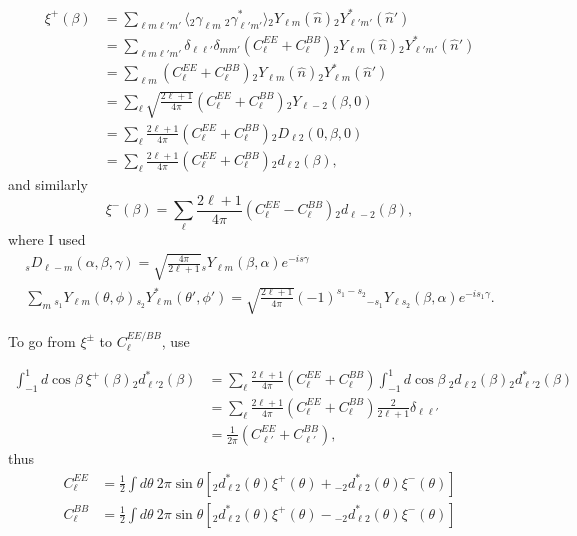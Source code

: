 \begin{align}
    \nonumber \xi^+(\beta) &= \sum_{\ell m \ell'm'}\langle{}_2 \gamma_{\ell m} ~ {}_2 \gamma^*_{\ell' m'}\rangle {}_2 Y_{\ell m}(\hat{n}) {}_2 Y^*_{\ell' m'}(\hat{n}') \\
    &=  \nonumber \sum_{\ell m \ell'm'} \delta_{\ell \ell'} \delta_{m m'} (C^{EE}_\ell + C^{BB}_\ell) {}_2 Y_{\ell m}(\hat{n}) {}_2 Y^*_{\ell' m'}(\hat{n}') \\
    &= \nonumber \sum_{\ell m} (C^{EE}_\ell + C^{BB}_\ell) {}_2 Y_{\ell m}(\hat{n}) {}_2 Y^*_{\ell m}(\hat{n}')\\
    &= \nonumber \sum_\ell \sqrt{\frac{2\ell+1}{4\pi}} (C^{EE}_\ell + C^{BB}_\ell) {}_{2} Y_{\ell -2}(\beta, 0) \\
    &= \nonumber \sum_\ell \frac{2\ell+1}{4\pi} (C^{EE}_\ell + C^{BB}_\ell) {}_2 D_{\ell 2}(0, \beta, 0)\\
    &= \sum_\ell \frac{2\ell+1}{4\pi} (C^{EE}_\ell + C^{BB}_\ell) {}_2 d_{\ell 2}(\beta),
\end{align}
and similarly
\begin{equation}
    \xi^-(\beta)=\sum_\ell \frac{2\ell+1}{4\pi} (C^{EE}_\ell - C^{BB}_\ell) {}_2 d_{\ell -2}(\beta),
\end{equation}
where I used
\begin{align}
    {}_{s} D_{\ell -m}(\alpha, \beta, \gamma) = \sqrt{\frac{4\pi}{2\ell+1}} {}_s Y_{\ell m}(\beta, \alpha) e^{-i s \gamma}\\
    \sum_m {}_{s_1} Y_{\ell m}(\theta, \phi){}_{s_2} Y^*_{\ell m}(\theta', \phi') = \sqrt{\frac{2\ell+1}{4\pi}}(-1)^{s_1-s_2} {}_{-s_1} Y_{\ell s_2} (\beta, \alpha) e^{-is_1\gamma}.
\end{align}

To go from $\xi^\pm$ to $C^{EE/BB}_\ell$, use

\begin{align}
    \nonumber\int_{-1}^1 d\cos\beta\:\xi^+(\beta) {}_2 d^*_{\ell' 2}(\beta) &= \sum_\ell \frac{2\ell+1}{4\pi} (C^{EE}_\ell + C^{BB}_\ell) \int_{-1}^1 d\cos\beta\: {}_2 d_{\ell 2}(\beta) {}_2 d^*_{\ell'2}(\beta)\\
    &\nonumber= \sum_\ell \frac{2\ell+1}{4\pi} (C^{EE}_\ell + C^{BB}_\ell) \frac{2}{2\ell+1}\delta_{\ell\ell'} \\
    &= \frac{1}{2\pi}(C^{EE}_{\ell'} + C^{BB}_{\ell'}),
\end{align}
thus
\begin{align}
    C^{EE}_\ell &= \frac{1}{2}\int d\theta\:2\pi\sin\theta[{}_2 d^*_{\ell 2}(\theta) \xi^+(\theta) + {}_{-2} d^*_{\ell 2}(\theta) \xi^-(\theta)]\\
    C^{BB}_\ell &= \frac{1}{2}\int d\theta\:2\pi\sin\theta[{}_2 d^*_{\ell 2}(\theta) \xi^+(\theta) - {}_{-2} d^*_{\ell 2}(\theta) \xi^-(\theta)]
\end{align}

